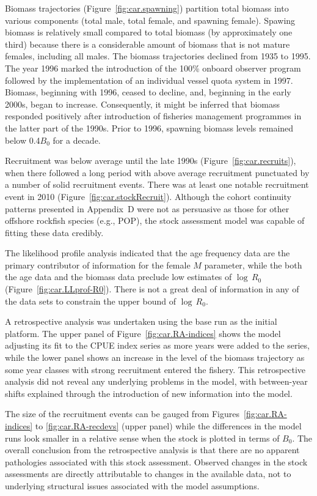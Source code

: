 \documentclass[11pt]{book}
\newcommand{\AppBio}{Appendix~D}
\newcommand{\pc}{\%}
\begin{document}
Biomass trajectories (Figure~\ref{fig:car.spawning}) partition total biomass into various components (total male, total female, and spawning female).
Spawing biomass is relatively small compared to total biomass (by approximately one third) because there is a considerable amount of biomass that is not mature females, including all males.
The biomass trajectories declined from 1935 to 1995.
The year 1996 marked the introduction of the 100\pc{} onboard observer program followed by the implementation of an individual vessel quota system in 1997.
Biomass, beginning with 1996, ceased to decline, and, beginning in the early 2000s, began to increase.
Consequently, it might be inferred that biomass responded positively after introduction of fisheries management programmes in the latter part of the 1990s.
Prior to 1996, spawning biomass levels remained below 0.4$B_0$ for a decade.

Recruitment was below average until the late 1990s (Figure~\ref{fig:car.recruits}), when there followed a long period with above average recruitment punctuated by a number of solid recruitment events.
There was at least one notable recruitment event in 2010 (Figure~\ref{fig:car.stockRecruit}).
Although the cohort continuity patterns presented in \AppBio{} were not as persuasive as those for other offshore rockfish species (e.g., POP), the stock assessment model was capable of fitting these data credibly.

The likelihood profile analysis indicated that the age frequency data are the primary contributor of information for the female $M$ parameter, while the both the age data and the biomass data preclude low estimates of $\log\,R_0$ (Figure~\ref{fig:car.LLprof-R0}).
There is not a great deal of information in any of the data sets to constrain the upper bound of $\log\,R_0$.

A retrospective analysis was undertaken using the base run as the initial platform.
The upper panel of Figure~\ref{fig:car.RA-indices} shows the model adjusting its fit to the CPUE index series as more years were added to the series, while the lower panel shows an increase in the level of the biomass trajectory as some year classes with strong recruitment entered the fishery.
This retrospective analysis did not reveal any underlying problems in the model, with between-year shifts explained through the introduction of new information into the model.

The size of the recruitment events can be gauged from Figures~\ref{fig:car.RA-indices} to \ref{fig:car.RA-recdevs} (upper panel) while the differences in the model runs look smaller in a relative sense when the stock is plotted in terms of $B_0$.
The overall conclusion from the retrospective analysis is that there are no apparent pathologies associated with this stock assessment.
Observed changes in the stock assessments are directly attributable to changes in the available data, not to underlying structural issues associated with the model assumptions.
\end{document}
